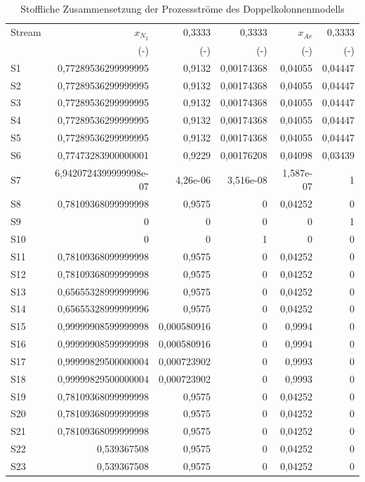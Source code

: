 \begin{longtable}{lrrrrr}
\caption{Stoffliche Zusammensetzung der Prozessströme des Doppelkolonnenmodells} \\
\hline
Stream & $x_{N_2}$ & 0,3333 & 0,3333 & $x_{Ar}$ & 0,3333 \\
 & (-) & (-) & (-) & (-) & (-) \\
\hline
S1 & 0,77289536299999995 & 0,9132 & 0,00174368 & 0,04055 & 0,04447 \\
S2 & 0,77289536299999995 & 0,9132 & 0,00174368 & 0,04055 & 0,04447 \\
S3 & 0,77289536299999995 & 0,9132 & 0,00174368 & 0,04055 & 0,04447 \\
S4 & 0,77289536299999995 & 0,9132 & 0,00174368 & 0,04055 & 0,04447 \\
S5 & 0,77289536299999995 & 0,9132 & 0,00174368 & 0,04055 & 0,04447 \\
S6 & 0,77473283900000001 & 0,9229 & 0,00176208 & 0,04098 & 0,03439 \\
S7 & 6,9420724399999998e-07 & 4,26e-06 & 3,516e-08 & 1,587e-07 & 1 \\
S8 & 0,78109368099999998 & 0,9575 & 0 & 0,04252 & 0 \\
S9 & 0 & 0 & 0 & 0 & 1 \\
S10 & 0 & 0 & 1 & 0 & 0 \\
S11 & 0,78109368099999998 & 0,9575 & 0 & 0,04252 & 0 \\
S12 & 0,78109368099999998 & 0,9575 & 0 & 0,04252 & 0 \\
S13 & 0,65655328999999996 & 0,9575 & 0 & 0,04252 & 0 \\
S14 & 0,65655328999999996 & 0,9575 & 0 & 0,04252 & 0 \\
S15 & 0,99999908599999998 & 0,000580916 & 0 & 0,9994 & 0 \\
S16 & 0,99999908599999998 & 0,000580916 & 0 & 0,9994 & 0 \\
S17 & 0,99999829500000004 & 0,000723902 & 0 & 0,9993 & 0 \\
S18 & 0,99999829500000004 & 0,000723902 & 0 & 0,9993 & 0 \\
S19 & 0,78109368099999998 & 0,9575 & 0 & 0,04252 & 0 \\
S20 & 0,78109368099999998 & 0,9575 & 0 & 0,04252 & 0 \\
S21 & 0,78109368099999998 & 0,9575 & 0 & 0,04252 & 0 \\
S22 & 0,539367508 & 0,9575 & 0 & 0,04252 & 0 \\
S23 & 0,539367508 & 0,9575 & 0 & 0,04252 & 0 \\

\end{longtable}

